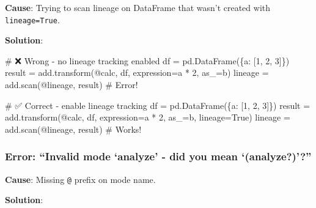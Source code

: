 \documentclass[
  letterpaper,
]{scrbook}
\newenvironment{Shaded}{\begin{snugshade}}{\end{snugshade}}
\newcommand{\CommentTok}[1]{\textcolor[rgb]{0.37,0.37,0.37}{#1}}
\newcommand{\DecValTok}[1]{\textcolor[rgb]{0.68,0.00,0.00}{#1}}
\newcommand{\NormalTok}[1]{\textcolor[rgb]{0.00,0.23,0.31}{#1}}
\newcommand{\OperatorTok}[1]{\textcolor[rgb]{0.37,0.37,0.37}{#1}}
\newcommand{\StringTok}[1]{\textcolor[rgb]{0.13,0.47,0.30}{#1}}
\newcommand{\VariableTok}[1]{\textcolor[rgb]{0.07,0.07,0.07}{#1}}
\begin{document}
\textbf{Cause}: Trying to scan lineage on DataFrame that wasn't created
with \texttt{lineage=True}.

\textbf{Solution}:

\begin{Shaded}
\begin{Highlighting}[]
\CommentTok{\# ❌ Wrong {-} no lineage tracking enabled}
\NormalTok{df }\OperatorTok{=}\NormalTok{ pd.DataFrame(\{}\StringTok{\textquotesingle{}a\textquotesingle{}}\NormalTok{: [}\DecValTok{1}\NormalTok{, }\DecValTok{2}\NormalTok{, }\DecValTok{3}\NormalTok{]\})}
\NormalTok{result }\OperatorTok{=}\NormalTok{ add.transform(}\StringTok{\textquotesingle{}@calc\textquotesingle{}}\NormalTok{, df, expression}\OperatorTok{=}\StringTok{\textquotesingle{}a * 2\textquotesingle{}}\NormalTok{, as\_}\OperatorTok{=}\StringTok{\textquotesingle{}b\textquotesingle{}}\NormalTok{)}
\NormalTok{lineage }\OperatorTok{=}\NormalTok{ add.scan(}\StringTok{\textquotesingle{}@lineage\textquotesingle{}}\NormalTok{, result)  }\CommentTok{\# Error!}

\CommentTok{\# ✅ Correct {-} enable lineage tracking}
\NormalTok{df }\OperatorTok{=}\NormalTok{ pd.DataFrame(\{}\StringTok{\textquotesingle{}a\textquotesingle{}}\NormalTok{: [}\DecValTok{1}\NormalTok{, }\DecValTok{2}\NormalTok{, }\DecValTok{3}\NormalTok{]\})}
\NormalTok{result }\OperatorTok{=}\NormalTok{ add.transform(}\StringTok{\textquotesingle{}@calc\textquotesingle{}}\NormalTok{, df, expression}\OperatorTok{=}\StringTok{\textquotesingle{}a * 2\textquotesingle{}}\NormalTok{, as\_}\OperatorTok{=}\StringTok{\textquotesingle{}b\textquotesingle{}}\NormalTok{, lineage}\OperatorTok{=}\VariableTok{True}\NormalTok{)}
\NormalTok{lineage }\OperatorTok{=}\NormalTok{ add.scan(}\StringTok{\textquotesingle{}@lineage\textquotesingle{}}\NormalTok{, result)  }\CommentTok{\# Works!}
\end{Highlighting}
\end{Shaded}

\subsubsection{\texorpdfstring{Error: ``Invalid mode `analyze' - did you
mean
`(\textbf{analyze?})'?''}{Error: ``Invalid mode `analyze' - did you mean `(analyze?)'?''}}\label{error-invalid-mode-analyze---did-you-mean-analyze}

\textbf{Cause}: Missing \texttt{@} prefix on mode name.

\textbf{Solution}:
\end{document}
